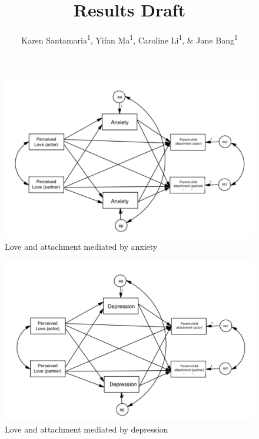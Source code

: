 \documentclass[man]{apa6}
\title{Results Draft}
\author{Karen Santamaria\textsuperscript{1}, Yifan Ma\textsuperscript{1}, Caroline Li\textsuperscript{1}, \& Jane Bang\textsuperscript{1}}
\date{}
\affiliation{
\vspace{0.5cm}
\textsuperscript{1} Smith College}
\begin{document}
\maketitle

\begin{figure}

{\centering \includegraphics[width=500px]{figure1} 

}

\caption{Love and attachment mediated by anxiety}\label{fig:unnamed-chunk-1}
\end{figure}

\begin{figure}

{\centering \includegraphics[width=500px]{figure2} 

}

\caption{Love and attachment mediated by depression}\label{fig:unnamed-chunk-2}
\end{figure}
\end{document}
